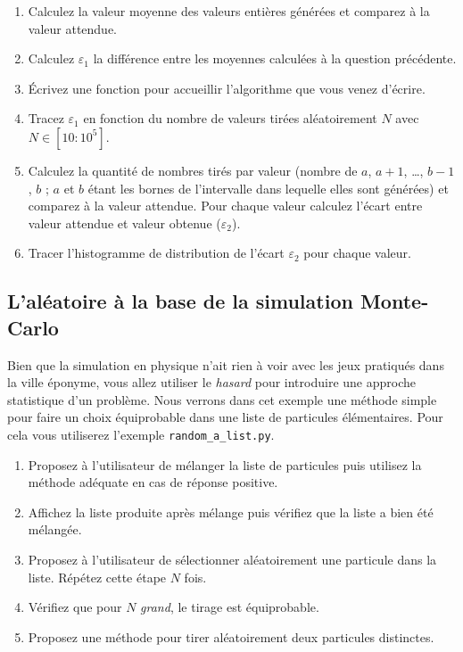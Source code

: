 \begin{enumerate}
\item  Calculez la  valeur moyenne  des valeurs  entières générées  et
  comparez à la valeur attendue.

\item  Calculez  $\varepsilon_1$  la  différence  entre  les  moyennes
  calculées à la question précédente.

\item Écrivez une fonction pour accueillir l'algorithme que vous venez
  d'écrire.

  
\item Tracez $\varepsilon_1$  en fonction du nombre  de valeurs tirées
  aléatoirement $N$ avec $N \in [10:10^5]$.
  
\item Calculez la quantité de nombres tirés par valeur (nombre de $a$,
  $a+1$, \dots,  $b-1$, $b$ ; $a$ et $b$ étant les bornes de 
  l'intervalle dans lequelle elles sont générées)  et comparez à
  la valeur  attendue. Pour
  chaque  valeur  calculez l'écart  entre  valeur  attendue et  valeur
  obtenue ($\varepsilon_2$).

\item Tracer l'histogramme de  distribution de l'écart $\varepsilon_2$
  pour chaque valeur.

\end{enumerate}


\subsection{L'aléatoire à la base de la simulation Monte-Carlo}

Bien que  la simulation en  physique n'ait rien  à voir avec  les jeux
pratiqués   dans   la   ville   éponyme,  vous   allez   utiliser   le
\textit{hasard}   pour  introduire   une  approche   statistique  d'un
problème.  Nous verrons dans cet exemple une méthode simple pour faire
un choix équiprobable dans une liste de particules élémentaires.  Pour
cela vous utiliserez l'exemple \texttt{random\_a\_list.py}.

\begin{enumerate}
\item Proposez à l'utilisateur de mélanger la liste de particules puis
  utilisez la méthode adéquate en cas de réponse positive.  %
\item Affichez  la liste produite  après mélange puis vérifiez  que la
  liste a bien été mélangée.  %
\item  Proposez  à  l'utilisateur de  sélectionner  aléatoirement  une
  particule dans la liste. Répétez cette étape $N$ fois.  %
\item   Vérifiez  que   pour   $N$  \textit{grand},   le  tirage   est
  équiprobable.  %
\item Proposez  une méthode pour tirer  aléatoirement deux particules
  distinctes.  %
\end{enumerate}

